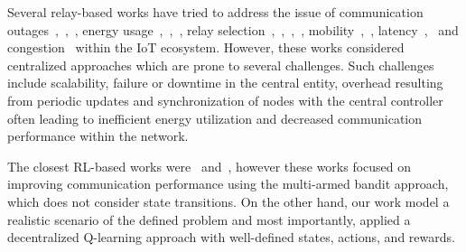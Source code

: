 \documentclass[journal]{IEEEtran}
\begin{document}
Several relay-based works have tried to address the issue of communication outages~\cite{OmoniwaRelay2018},~\cite{Simiscuka2018},~\cite{Kawabata2017}, energy usage~\cite{Alsharoa2018},~\cite{Lv2018},~\cite{Behdad2018}, relay selection~\cite{OmoniwaRelay2018},~\cite{Simiscuka2018},~\cite{Manzoor2018},~\cite{Kawabata2017}, mobility~\cite{OmoniwaRelay2018},~\cite{Manzoor2018}, latency~\cite{Simiscuka2018},~\cite{Behdad2018} and congestion~\cite{Behdad2018} within the IoT ecosystem. However, these works considered centralized approaches which are prone to several challenges. Such challenges include scalability, failure or downtime in the central entity, overhead resulting from periodic updates and synchronization of nodes with the central controller often leading to inefficient energy utilization and decreased communication performance within the network.

The closest RL-based works were~\cite{Wilhelmi2017} and~\cite{Azari2018}, however these works focused on improving communication performance using the multi-armed bandit approach, which does not consider state transitions. On the other hand, our work model a realistic scenario of the defined problem and most importantly, applied a decentralized Q-learning approach with well-defined states, actions, and rewards.

%
\end{document}
